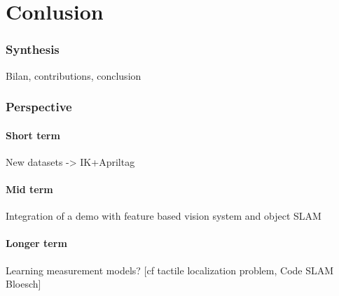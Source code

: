 \part{Conlusion}

\section{Synthesis}
Bilan, contributions, conclusion

\section{Perspective}
\subsection{Short term}
New datasets -> IK+Apriltag

\subsection{Mid term}
Integration of a demo with feature based vision system and object SLAM

\subsection{Longer term}
Learning measurement models? [cf tactile localization problem, Code SLAM Bloesch]


